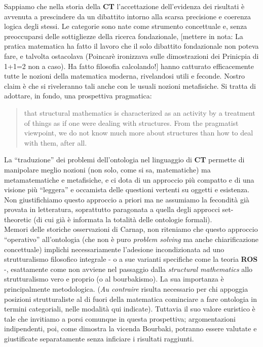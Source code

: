 \documentclass[a4paper, 11pt]{article}
\begin{document}
Sappiamo che nella storia della \textbf{CT} l'accettazione dell'evidenza dei risultati è avvenuta a prescindere da un dibattito intorno alla scarsa precisione e coerenza logica degli stessi. Le categorie sono nate come strumento concettuale e, senza preoccuparsi delle sottigliezze della ricerca fondazionale, [mettere in nota: La pratica matematica ha fatto il lavoro che il solo dibattito fondazionale non poteva fare, e talvolta ostacolava (Poincarè ironizzava sulle dimostrazioni dei Prinicpia di 1+1=2 non a caso). Ha fatto filosofia calcolando!]
hanno catturato efficacemente tutte le nozioni della matematica moderna, rivelandosi utili e feconde. Nostro claim è che si riveleranno tali anche con le usuali nozioni metafisiche. Si tratta di adottare, in fondo, una prospettiva pragmatica:
\begin{quotation}
	that structural mathematics is characterized as an activity by a treatment of things as if one were dealing with structures. From the pragmatist viewpoint, we do not know much more about structures than how to deal with them, after all.
\end{quotation}
La ``traduzione'' dei problemi dell'ontologia nel linguaggio di \textbf{CT} permette di manipolare meglio nozioni (non solo, come si sa, matematiche) ma metamatematiche e metafisiche, e ci dota di un approccio più compatto e di una visione più ``leggera'' e occamista delle questioni vertenti su oggetti e esistenza. Non giustifichiamo questo approccio a priori ma ne assumiamo la fecondità già provata in letteratura, soprattutto paragonata a quella degli approcci set-theoretic (di cui già è informata la totalità delle ontologie formali).\\
Memori delle storiche osservazioni di Carnap, non riteniamo che questo approccio ``operativo'' all'ontologia (che non è puro \textit{problem solving} ma anche chiarificazione concettuale) implichi necessariamente l'adesione incondizionata ad uno strutturalismo filosofico integrale - o a sue varianti specifiche come la teoria \textbf{ROS} -, esattamente come non avviene nel passaggio dalla \textit{structural mathematics} allo strutturalismo vero e proprio (o al bourbakismo). La sua importanza è principalmente metodologica. (\textit{Au contraire} risulta necessario per chi appoggia posizioni strutturaliste al di fuori della matematica cominciare a fare ontologia in termini categoriali, nelle modalità qui indicate). Tuttavia il suo valore euristico è tale che invitiamo a porsi comunque in questa prospettiva; argomentazioni indipendenti, poi, come dimostra la vicenda Bourbaki, potranno essere valutate e giustificate separatamente senza inficiare i risultati raggiunti.
\end{document}
